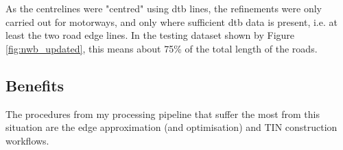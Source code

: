 As the centrelines were "centred" using \ac{dtb} lines, the refinements were only carried out for motorways, and only where sufficient \ac{dtb} data is present, i.e. at least the two road edge lines. In the testing dataset shown by Figure \ref{fig:nwb_updated}, this means about 75\% of the total length of the roads.

\subsection{Benefits }
\label{sub:nwb_updated_geometry}

The procedures from my processing pipeline that suffer the most from this situation are the edge approximation (and optimisation) and TIN construction workflows.